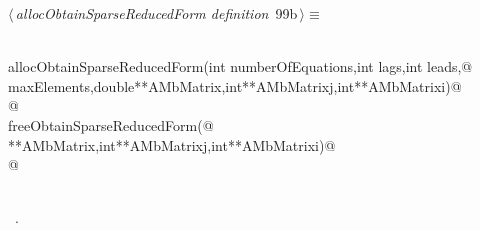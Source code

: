 \documentclass{article}
\begin{document}
\begin{flushleft} \small
\begin{minipage}{\linewidth}\label{scrap184}\raggedright\small
{} $\langle\,${\itshape allocObtainSparseReducedForm definition}\nobreak\ {\footnotesize {99b}}$\,\rangle\equiv$
\vspace{-1ex}
\begin{list}{}{} \item
\mbox{}\verb@@\\
\mbox{}\verb@void allocObtainSparseReducedForm(int numberOfEquations,int lags,int leads,@\\
\mbox{}\verb@int maxElements,double**AMbMatrix,int**AMbMatrixj,int**AMbMatrixi)@\\
\mbox{}@\\
\mbox{}\verb@void freeObtainSparseReducedForm(@\\
\mbox{}\verb@double**AMbMatrix,int**AMbMatrixj,int**AMbMatrixi)@\\
\mbox{}@\\
\mbox{}\verb@@\\
\mbox{}\verb@@{\NWsep}
\end{list}
\vspace{-1.5ex}
\footnotesize
\begin{list}{}{\setlength{\itemsep}{-\parsep}\setlength{\itemindent}{-\leftmargin}}
\item \NWtxtMacroRefIn\ .

\item{}
\end{list}
\end{minipage}\vspace{4ex}
\end{flushleft}
\end{document}
